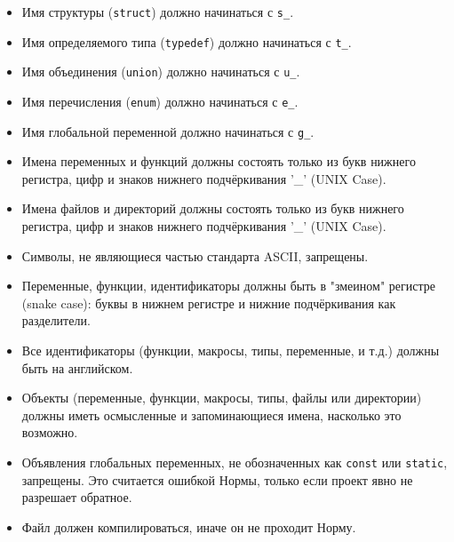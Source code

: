 \documentclass{42-ru}
\begin{document}
        \begin{itemize}

            \item Имя структуры (\texttt{struct}) должно начинаться с \texttt{s\_}.

            \item Имя определяемого типа (\texttt{typedef}) должно начинаться с \texttt{t\_}.

            \item Имя объединения (\texttt{union}) должно начинаться с \texttt{u\_}.

            \item Имя перечисления (\texttt{enum}) должно начинаться с \texttt{e\_}.

            \item Имя глобальной переменной должно начинаться с \texttt{g\_}.

            \item Имена переменных и функций должны состоять только из букв нижнего регистра, цифр и знаков нижнего подчёркивания '\_' (UNIX Case).

            \item Имена файлов и директорий должны состоять только из букв нижнего регистра, цифр и знаков нижнего подчёркивания '\_' (UNIX Case).

            \item Символы, не являющиеся частью стандарта ASCII, запрещены.

            \item Переменные, функции, идентификаторы должны быть в "змеином" регистре (snake case): буквы в нижнем регистре и нижние подчёркивания как разделители.

            \item Все идентификаторы (функции, макросы, типы, переменные, и т.д.) должны быть на английском.

            \item Объекты (переменные, функции, макросы, типы, файлы или директории) должны иметь осмысленные и запоминающиеся имена, насколько это возможно.

            \item Объявления глобальных переменных, не обозначенных как \texttt{const} или \texttt{static}, запрещены. Это считается ошибкой Нормы, только если проект явно не разрешает обратное.

            \item Файл должен компилироваться, иначе он не проходит Норму.

        \end{itemize}
\end{document}
